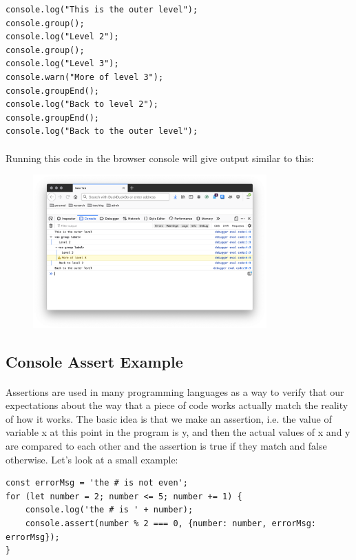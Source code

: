 \begin{lstlisting}
console.log("This is the outer level");
console.group();
console.log("Level 2");
console.group();
console.log("Level 3");
console.warn("More of level 3");
console.groupEnd();
console.log("Back to level 2");
console.groupEnd();
console.log("Back to the outer level");
\end{lstlisting}

\paragraph{} Running this code in the browser console will give output similar to this:

\begin{figure}[H]
\centering
\includegraphics[width=0.8\textwidth]{figures/console-group}
\label{fig:console-group}
\caption{}
\end{figure}



\subsection{Console Assert Example}
\paragraph{} Assertions are used in many programming languages as a way to verify that our expectations about the way that a piece of code works actually match the reality of how it works. The basic idea is that we make an assertion, i.e. the value of variable x at this point in the program is y, and then the actual values of x and y are compared to each other and the assertion is true if they match and false otherwise. Let's look at a small example:

\begin{lstlisting}
const errorMsg = 'the # is not even';
for (let number = 2; number <= 5; number += 1) {
    console.log('the # is ' + number);
    console.assert(number % 2 === 0, {number: number, errorMsg: errorMsg});
}
\end{lstlisting}

